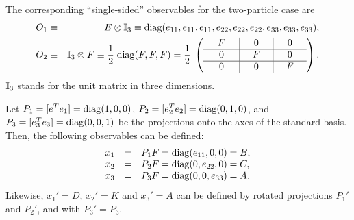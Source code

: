 \documentclass[pra,preprint,showpacs,showkeys,amsfonts]{revtex4}
\begin{document}
The corresponding ``single-sided'' observables for the two-particle case are
\begin{eqnarray}
O_1 &\equiv & E \otimes {\Bbb I}_3 \equiv
{\rm diag}(e_{11}, e_{11}, e_{11}, e_{22}, e_{22}, e_{22}, e_{33}, e_{33}, e_{33})
,
\\
O_2 &\equiv & {\Bbb I}_3 \otimes F \equiv
{1\over {2}} \;
{\rm diag}(F, F, F) =
{1\over {2}} \;
\left( \begin{array}{c|c|c} \quad F\quad &\quad 0\quad &\quad 0 \quad  \\\hline 0&F&0    \\ \hline 0&0&F \end{array} \right)
.
\end{eqnarray}
${\Bbb I}_3$ stands for the unit matrix in three dimensions.

Let
$P_1=[e_1^T e_1]={\rm diag}(1,0,0)$,
$P_2=[e_2^T e_2]={\rm diag}(0,1,0)$,
and
$P_3=[e_3^T e_3]={\rm diag}(0,0,1)$ be the projections
onto the  axes of the  standard basis.
Then, the following observables can be defined:
\begin{equation}
\begin{array}{lll}
x_1&=&P_1F={\rm diag}(e_{11},0,0)=B, \\
x_2&=&P_2F={\rm diag}(0,e_{22},0)=C,   \\
x_3&=&P_3F={\rm diag}(0,0,e_{33})=A.
\end{array}
\label{2004-analog-Epiover4b3pco}
\end{equation}
Likewise, $x_1'=D$, $x_2'=K$ and $x_3'=A$ can be defined
by  rotated projections $P_1'$ and $P_2'$, and with $P_3'=P_3$.
\end{document}
